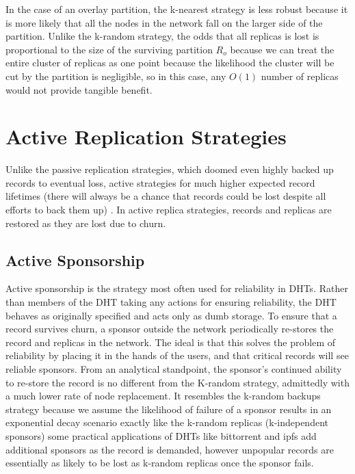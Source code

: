 In the case of an overlay partition, the k-nearest strategy is less robust because it is more likely that all the nodes in the network fall on the larger side of the partition.
Unlike the k-random strategy, the odds that all replicas is lost is proportional to the size of the surviving partition $R_{o}$ because we can treat the entire cluster of replicas as one point because the likelihood the cluster will be cut by the partition is negligible, so in this case, any $O(1)$ number of replicas would not provide tangible benefit.

  


\section{Active Replication Strategies}

Unlike the passive replication strategies, which doomed even highly backed up records to eventual loss, active strategies for much higher expected record lifetimes (there will always be a chance that records could be lost despite all efforts to back them up) .
In active replica strategies, records and replicas are restored as they are lost due to churn.


\subsection{Active Sponsorship}

Active sponsorship is the strategy most often used for reliability in DHTs.
Rather than members of the DHT taking any actions for ensuring reliability, the DHT behaves as originally specified and acts only as dumb storage.
To ensure that a record survives churn, a sponsor outside the network periodically re-stores the record and replicas in the network.
The ideal is that this solves the problem of reliability by placing it in the hands of the users, and that critical records will see reliable sponsors.
From an analytical standpoint, the sponsor's continued ability to re-store the record is no different from the K-random strategy, admittedly with a much lower rate of node replacement.
It resembles the k-random backups strategy because we assume the likelihood of failure of a sponsor results in an exponential decay scenario exactly like the k-random replicas (k-independent sponsors) some practical applications of DHTs like bittorrent and ipfs add additional sponsors as the record is demanded, however unpopular records are essentially as likely to be lost as k-random replicas once the sponsor fails.



